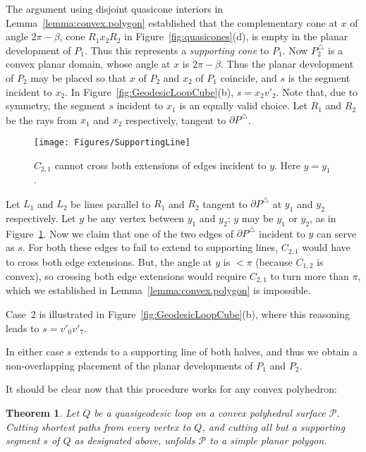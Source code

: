 \pdfoutput=1  \documentclass[]{article}
\newtheorem{theorem}{{\bf Theorem}}
\newcommand{\thmlab}[1]{\label{thm:#1}}
\newcommand{\figlab}[1]{\label{fig:#1}}
\newcommand{\lemref}[1]{\ref{lemma:#1}}
\newcommand{\figref}[1]{\ref{fig:#1}}
\def\P{{\mathcal P}}
\def\b{{\beta}}
\def\bP{{\partial P}}
\begin{document}
\begin{enumerate}
{The argument using disjoint quasicone interiors 
in Lemma~\lemref{convex.polygon}
established that the complementary cone at
$x$
of angle $2\pi-\b$, cone $R_1x_2R_2$ in 
Figure~\figref{quasicones}(d), is empty in the planar
development of $P_1$.
Thus this represents a \emph{supporting cone} to $P_1$.
Now $P_2^\triangle$ is a convex planar domain, whose angle
at $x$ is $2\pi-\b$.  Thus the planar development of
$P_2$ may be placed so that $x$ of $P_2$ and $x_2$ of $P_1$ coincide,
and $s$ is the segment incident to $x_2$.
In Figure~\figref{GeodesicLoopCube}(b),
$s=x_2 v'_2$.
Note that, due to symmetry, the segment $s$ incident to $x_1$
is an equally valid choice.
}Let $R_1$ and $R_2$ be the rays from $x_1$ and $x_2$ respectively, tangent
to $\bP^\triangle$.
\begin{figure}[htbp]
\centering
\texttt{[image: Figures/SupportingLine]}
\caption{
$C_{2,1}$ cannot cross both extensions of 
edges incident to $y$.
Here $y=y_1$.
}
\figlab{SupportingLine}
\end{figure}
Let $L_1$ and $L_2$ be lines parallel to $R_1$ and $R_2$
tangent to $\bP^\triangle$ at $y_1$ and $y_2$ respectively.
Let $y$ be any vertex between $y_1$ and $y_2$;
$y$ may be $y_1$ or $y_2$, as in
Figure~\figref{SupportingLine}.
Now we claim that one of the two edges of 
$\bP^\triangle$
incident to $y$ can serve as $s$.
For both these edges to fail to extend to supporting
lines, $C_{2,1}$ would have to cross both edge extensions.
But, the angle at $y$ is ${<}\pi$
(because $C_{1,2}$ is convex),
so crossing both edge extensions would require
$C_{2,1}$ 
to turn more than $\pi$, which we established in
Lemma~\lemref{convex.polygon} is impossible.

Case~2 is illustrated in Figure~\figref{GeodesicLoopCube}(b),
where this reasoning leads to $s=v'_0 v'_7$.
\end{enumerate}

\noindent
In either case $s$ extends to a supporting line
of both halves, and thus we obtain
a non-overlapping placement of the
planar developments of $P_1$ and $P_2$.



It should be clear now that this procedure works for any convex polyhedron:
\begin{theorem}
Let $Q$ be a quasigeodesic loop on a convex polyhedral surface $\P$.
Cutting shortest paths from every vertex to $Q$, and cutting all but
a supporting segment $s$ of $Q$ as designated above,
unfolds $\P$ to a simple planar polygon.
\thmlab{main}
\end{theorem}
\end{document}

